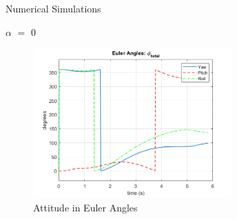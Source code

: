 \documentclass{beamer}
\begin{document}
\begin{frame}{Numerical Simulations}
	\begin{block}{$\alpha$ $=$ 0}
		
		\begin{figure}[H]
			\label{fig:euler_ang_phi_total_alpha0}
			\begin{center}
				\includegraphics[width=3in]{figures/alpha0/euler_angles.png}
			\end{center}
			\caption{Attitude in Euler Angles}
		\end{figure}
		
	\end{block}
\end{frame}
\end{document}

